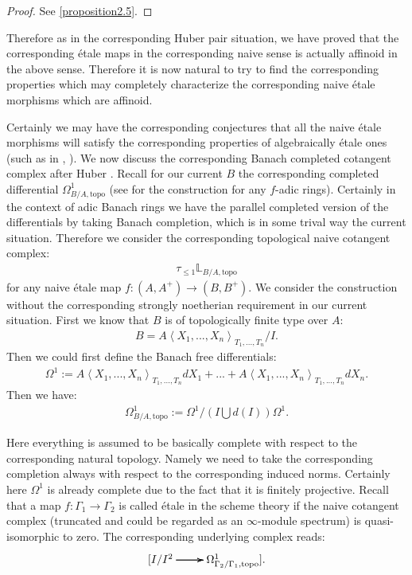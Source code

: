 \documentclass[12pt]{amsart}
\theoremstyle{definition}
\numberwithin{equation}{section}
\begin{document}
\begin{proof}
See \cref{proposition2.5}.
\end{proof}


\indent Therefore as in the corresponding Huber pair situation, we have proved that the corresponding \'etale maps in the corresponding naive sense is actually affinoid in the above sense. Therefore it is now natural to try to find the corresponding properties which may completely characterize the corresponding naive \'etale morphisms which are affinoid.



\indent Certainly we may have the corresponding conjectures that all the naive \'etale morphisms will satisfy the corresponding properties of algebraically \'etale ones (such as in \cite[Chapitre 17]{EGAIV4}, \cite[Tag 00U1]{SP}). We now discuss the corresponding Banach completed cotangent complex after Huber \cite[1.6.2]{Hu1}. Recall for our current $B$ the corresponding completed differential $\Omega^1_{B/A,\mathrm{topo}}$ (see \cite[1.6.2]{Hu1} for the construction for any $f$-adic rings). Certainly in the context of adic Banach rings we have the parallel completed version of the differentials by taking Banach completion, which is in some trival way the current situation. Therefore we consider the corresponding topological naive cotangent complex:
\begin{align}
\tau_{\leq 1}\mathbb{L}_{B/A,\mathrm{topo}}	
\end{align}
for any naive \'etale map $f:(A,A^+)\rightarrow (B,B^+)$. We consider the construction without the corresponding strongly noetherian requirement in our current situation. First we know that $B$ is of topologically finite type over $A$:
\begin{align}
B=A\left<X_1,...,X_n\right>_{T_1,...,T_n}/I.	
\end{align}
Then we could first define the Banach free differentials:
\begin{align}
\Omega^1:=A\left<X_1,...,X_n\right>_{T_1,...,T_n}dX_1+...+A\left<X_1,...,X_n\right>_{T_1,...,T_n}dX_n.	
\end{align}
Then we have:
\begin{align}
\Omega^1_{B/A,\mathrm{topo}}:=	\Omega^1\slash (I\bigcup d(I))\Omega^1.
\end{align}

Here everything is assumed to be basically complete with respect to the corresponding natural topology. Namely we need to take the corresponding completion always with respect to the corresponding induced norms. Certainly here $\Omega^1$ is already complete due to the fact that it is finitely projective. Recall that a map $f:\Gamma_1\rightarrow \Gamma_2$ is called \'etale in the scheme theory if the naive cotangent complex (truncated and could be regarded as an $\infty$-module spectrum) is quasi-isomorphic to zero. The corresponding underlying complex reads:
\[
\xymatrix@C+0pc@R+0pc{
[I/I^2\ar[r] \ar[r] \ar[r] &\Omega^1_{\Gamma_2/\Gamma_1,\mathrm{topo}}].
}
\]
\end{document}

